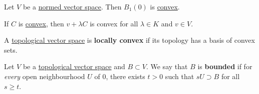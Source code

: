 \documentclass{article}
\begin{document}
\begin{fact}
    Let $V$ be a \hyperref[def:normed_vector_space]{normed vector space}. Then $B_1(0)$ is \hyperref[def:convex_subset]{convex}.
\end{fact}

\begin{fact}
    If $C$ is \hyperref[def:convex_subset]{convex}, then $v + \lambda C$ is convex for all $\lambda \in K$ and $v \in V$.
\end{fact}
\begin{defi}\label{def:locally_convex}
    A \hyperref[def:topological_vector_space]{topological vector space} is \textbf{locally convex} if its topology has a basis of convex sets.
\end{defi}
\begin{defi}[Bounded]\label{def:bounded}
    Let $V$ be a \hyperref[def:topological_vector_space]{topological vector space} and $B \subset V$. We say that $B$ is \textbf{bounded} if for \textit{every} open neighbourhood $U$ of $0$, there exists $t > 0$ such that $s U \supset B$ for all $s \geq t$.
\end{defi}
\end{document}
